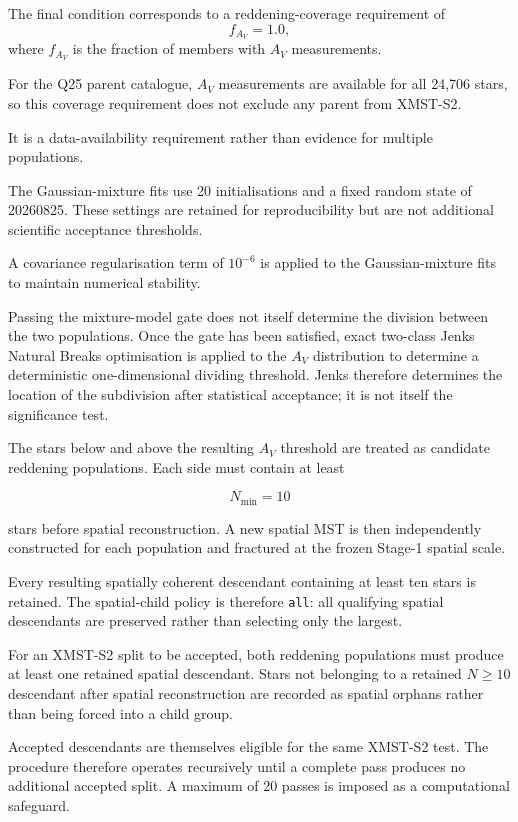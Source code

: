 \documentclass[fleqn,usenatbib]{rasti}
\begin{document}
The final condition corresponds to a reddening-coverage requirement of
\[
f_{A_V}=1.0,
\]
where \(f_{A_V}\) is the fraction of members with  \(A_V\) measurements.

For the Q25 parent catalogue, $A_V$ measurements are available for all 24,706 stars, so this coverage requirement does not exclude any parent from XMST-S2.

It is a data-availability requirement rather than evidence for multiple
populations.

The Gaussian-mixture fits use 20 initialisations and a fixed random state
of 20260825. These settings are retained for reproducibility but are not
additional scientific acceptance thresholds.

A covariance regularisation term of $10^{-6}$ is applied to the
Gaussian-mixture fits to maintain numerical stability.

Passing the mixture-model gate does not itself determine the division
between the two populations. Once the gate has been satisfied, exact
two-class Jenks Natural Breaks optimisation is applied to the $A_V$
distribution to determine a deterministic one-dimensional dividing
threshold. Jenks therefore determines the location of the subdivision
after statistical acceptance; it is not itself the significance test.

The stars below and above the resulting $A_V$ threshold are treated as
candidate reddening populations. Each side must contain at least

\[
N_{\min}=10
\]

stars before spatial reconstruction. A new spatial MST is then independently
constructed for each population and fractured at the frozen Stage-1 spatial
scale.

Every resulting spatially coherent descendant containing at least ten stars
is retained. The spatial-child policy is therefore \texttt{all}: all
qualifying spatial descendants are preserved rather than selecting only the
largest.

For an XMST-S2 split to be accepted, both reddening populations must produce
at least one retained spatial descendant. Stars not belonging to a retained
$N\geq10$ descendant after spatial reconstruction are recorded as spatial
orphans rather than being forced into a child group.

Accepted descendants are themselves eligible for the same XMST-S2 test.
The procedure therefore operates recursively until a complete pass produces
no additional accepted split. A maximum of 20 passes is imposed as a
computational safeguard.
\end{document}
